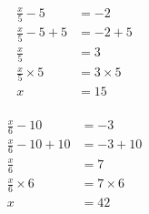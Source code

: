 \documentclass[12pt]{article}
\newcounter{minipagecount}
\begin{document}
\begin{multicols}{2}
\begin{minipage}[t]{0.45\textwidth}
    \vspace{-26pt}  %
    \raggedright %
    \begin{align*} %
        \frac{x}{5} - 5 &= -2\\
        \frac{x}{5} - 5 + 5 &= -2 + 5\\
        \frac{x}{5} &= 3\\
        \frac{x}{5} \times5 &= 3 \times5\\
        x &= 15\\
    \end{align*}
\end{minipage}\newpage
\noindent{(\theminipagecount)}\hspace{0.1mm} %
\begin{minipage}[t]{0.45\textwidth} %
    \vspace{-26pt}  %
    \raggedright %
    \begin{align*} %
        \frac{x}{6} - 10 &= -3\\
        \frac{x}{6} - 10 + 10 &= -3 + 10\\
        \frac{x}{6} &= 7\\
        \frac{x}{6} \times6 &= 7 \times6\\
        x &= 42\\
    \end{align*}
\end{minipage} %
\noindent{(\theminipagecount)}\hspace{0.1mm} %

\end{multicols}
\end{document}
